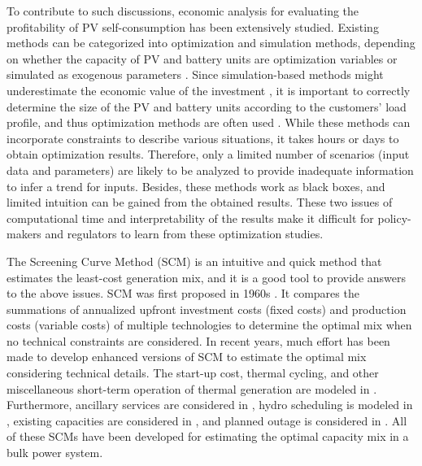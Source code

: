 \documentclass[lettersize,journal]{IEEEtran}
\begin{document}
%
To contribute to such discussions, economic analysis for evaluating the profitability of PV self-consumption has been extensively studied. 
Existing methods can be categorized into optimization and simulation
methods, depending on whether the capacity of PV and battery units are optimization variables or simulated as exogenous parameters \cite{han22}.
Since simulation-based methods might underestimate the economic
value of the investment \cite{zhang17:pv}, it is important
to correctly determine the size of the PV and battery units according to the customers’ load
profile, and thus optimization methods are often used  \cite{nyholm16,schopfer18,cervantes18}. 
While these methods can incorporate constraints to describe various situations, it takes hours or days to obtain optimization results.  
Therefore, only a limited number of scenarios (input data and parameters) are likely to be analyzed to provide inadequate information to infer a trend for inputs.
Besides, these methods work as black boxes, and limited intuition can be gained from the obtained results. 
These two issues of computational time and interpretability of the results make it difficult for policy-makers and regulators to learn from
these optimization studies. 


%
The Screening Curve Method (SCM) is an intuitive and quick method that estimates the least-cost generation mix, %
and it is a good tool to provide answers to the above issues.
SCM was first proposed in 1960s \cite{phillips69,lee78}.  
It compares the summations of annualized upfront investment costs (fixed costs) and production costs (variable costs) of multiple technologies to determine the optimal mix when no technical constraints are considered. 
In recent years, much effort has been made to develop enhanced versions of SCM to estimate the optimal mix considering technical details. 
The start-up cost, thermal cycling, and other miscellaneous short-term operation of thermal generation are modeled in \cite{batlle13,zhang15}. 
Furthermore, 
ancillary services are considered in \cite{zhang15:ancillary}, hydro scheduling is modeled in \cite{staffell16}, existing capacities are considered in \cite{zhang17,guner18}, and planned outage is considered in \cite{zhang19}. 
All of these SCMs have been developed for estimating the optimal capacity mix in a bulk power system. 

\IEEEpubidadjcol
\end{document}
